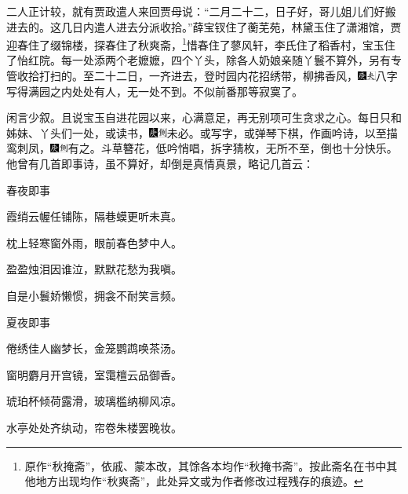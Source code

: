 二人正计较，就有贾政遣人来回贾母说：“二月二十二，日子好，哥儿姐儿们好搬进去的。这几日内遣人进去分派收拾。”薛宝钗住了蘅芜苑，林黛玉住了潇湘馆，贾迎春住了缀锦楼，探春住了秋爽斋，\footnote{原作“秋掩斋”，依戚、蒙本改，其馀各本均作“秋掩书斋”。按此斋名在书中其他地方出现均作“秋爽斋”，此处异文或为作者修改过程残存的痕迹。}惜春住了蓼风轩，李氏住了稻香村，宝玉住了怡红院。每一处添两个老嬷嬷，四个丫头，除各人奶娘亲随丫鬟不算外，另有专管收拾打扫的。至二十二日，一齐进去，登时园内花招绣带，柳拂香风，{\includegraphics[width=3mm]{../Images/00004}\includegraphics[width=3mm]{../Images/00012}\footnotesize \kaishu 八字写得满园之内处处有人，无一处不到。}不似前番那等寂寞了。

闲言少叙。且说宝玉自进花园以来，心满意足，再无别项可生贪求之心。每日只和姊妹、丫头们一处，或读书，{\includegraphics[width=3mm]{../Images/00004}\includegraphics[width=3mm]{../Images/00011}\footnotesize \kaishu 未必。}或写字，或弹琴下棋，作画吟诗，以至描鸾刺凤，{\includegraphics[width=3mm]{../Images/00004}\includegraphics[width=3mm]{../Images/00011}\footnotesize \kaishu 有之。}斗草簪花，低吟悄唱，拆字猜枚，无所不至，倒也十分快乐。他曾有几首即事诗，虽不算好，却倒是真情真景，略记几首云：

春夜即事

霞绡云幄任铺陈，隔巷蟆更听未真。

枕上轻寒窗外雨，眼前春色梦中人。

盈盈烛泪因谁泣，默默花愁为我嗔。

自是小鬟娇懒惯，拥衾不耐笑言频。

夏夜即事

倦绣佳人幽梦长，金笼鹦鹉唤茶汤。

窗明麝月开宫镜，室霭檀云品御香。

琥珀杯倾荷露滑，玻璃槛纳柳风凉。

水亭处处齐纨动，帘卷朱楼罢晚妆。

